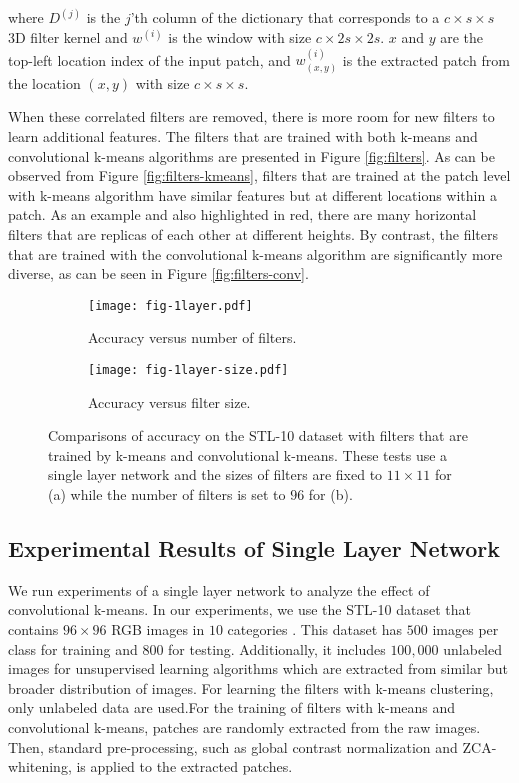 \documentclass{article} \usepackage{iclr2016_workshop,times}
\begin{document}
where $D^{(j)}$ is the $j$'th column of the dictionary that corresponds to a $c\times s\times s$ 3D filter kernel  and $w^{(i)}$ is the window with size $c\times 2s\times 2s$.
$x$ and $y$ are the top-left location index of the input patch, and $w^{(i)}_{(x, y)}$ is the extracted patch from the location $(x, y)$ with size $c\times s\times s$.

When these correlated filters are removed, there is more room for new filters to learn additional features.
The filters that are trained with both k-means and convolutional k-means algorithms are presented in Figure \ref{fig:filters}.
As can be observed from Figure \ref{fig:filters-kmeans}, filters that are trained at the patch level with k-means algorithm have similar features but at different locations within a patch.
As an example and also highlighted in red, there are many horizontal filters that are replicas of each other at different heights.
By contrast, the filters that are trained with the convolutional k-means algorithm are significantly more diverse, as can be seen in Figure \ref{fig:filters-conv}.

\begin{figure*} \centering
  \begin{subfigure}[b]{0.5\textwidth}
   \texttt{[image: fig-1layer.pdf]}
    \caption{Accuracy versus number of filters.}
  \label{fig:acc-features}
   \end{subfigure}\begin{subfigure}[b]{0.5\textwidth}
     \texttt{[image: fig-1layer-size.pdf]}
    \caption{Accuracy versus filter size.}
  \label{fig:acc-size}
   \end{subfigure}
  \caption{
    Comparisons of accuracy on the STL-10 dataset with filters that are trained by k-means and convolutional k-means.
    These tests use a single layer network and the sizes of filters are fixed to $11\times11$ for (a) while the number of filters is set to $96$ for (b).
  }
  \label{fig:accuracies}
\end{figure*}


\subsection{Experimental Results of Single Layer Network}\label{sec:oneLayer}

We run experiments of a single layer network to analyze the effect of convolutional k-means.
In our experiments, we use the STL-10 dataset that contains $96\times96$ RGB images in $10$ categories \citep{coates2011analysis}.
This dataset has $500$ images per class for training and $800$ for testing.
Additionally, it includes $100,000$ unlabeled images for unsupervised learning algorithms which are extracted from similar but broader distribution of images.
For learning the filters with k-means clustering, only unlabeled data are used.For the training of filters with k-means and convolutional k-means, patches are randomly extracted from the raw images.
Then, standard pre-processing, such as global contrast normalization and ZCA-whitening, is applied to the extracted patches.
\end{document}
